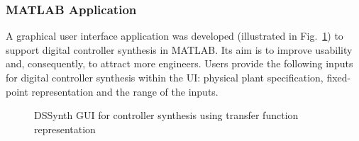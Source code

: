\documentclass[conference]{IEEEtran}
\begin{document}
\subsubsection{MATLAB Application} 

A graphical user interface application was developed (illustrated in
Fig.~\ref{fig:gui-for-tf}) to support digital controller synthesis in
MATLAB.  Its aim is to improve usability and, consequently, to attract more
engineers.  Users provide the following inputs for digital controller
synthesis within the UI: physical plant specification, fixed-point
representation and the range of the inputs.

\begin{figure}[ht]
    \centering
		\hfil
		\hfil
		\hfil
		\hfil
    \caption{DSSynth GUI for controller synthesis using transfer function representation}
    \label{fig:gui-for-tf}
\end{figure}
\end{document}
